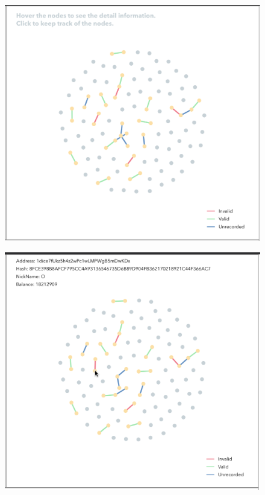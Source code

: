 \documentclass[journal, a4paper]{IEEEtran}
\begin{document}
\begin{figure}[!hbt]
		\begin{center}
		\includegraphics[width=\columnwidth]{transactions.png}
		\caption{}
		\label{fig:overall_design}
		\end{center}
	\end{figure}
	
\begin{figure}[!hbt]
		\begin{center}
		\includegraphics[width=\columnwidth]{transaction_hover.png}
		\caption{}
		\label{fig:transaction_hover}
		\end{center}
	\end{figure}
\end{document}

